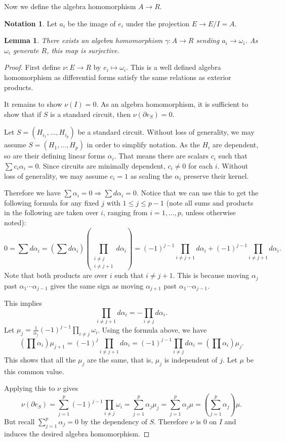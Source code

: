 \documentclass[article,twoside]{article}
\theoremstyle{plain}
\theoremstyle{plain}
\newtheorem{lemma}[lemma]{Lemma}
\theoremstyle{plain}
\theoremstyle{plain}
\theoremstyle{plain}
\theoremstyle{definition}
\theoremstyle{definition}
\newtheorem{notation}[notation]{Notation}
\theoremstyle{definition}
\theoremstyle{remark}
\theoremstyle{remark}
\begin{document}
Now we define the algebra homomorphism $A\to R$.

\begin{notation}
	Let $a_i$ be the image of $e_i$ under the projection $E\to E/I=A$.
\end{notation}

\begin{lemma}\label{os_brieskorn_alg_hom}%
	There exists an algebra homomorphism $\gamma:A\to R$ sending $a_i\to \omega_i$. As $\omega_i$ generate $R$, this map is surjective.
\end{lemma}
\begin{proof}
	First define $\nu:E\to R$ by $e_i\mapsto\omega_i$. This is a well defined algebra homomorphism as differential forms satisfy the same relations as exterior products.
	
	It remains to show $\nu(I)=0$. As an algebra homomorphism, it is sufficient to show that if $S$ is a standard circuit, then $\nu(\partial e_S)=0$.
	
	Let $S=(H_{i_1},\dots,H_{i_p})$ be a standard circuit. Without loss of generality, we may assume $S=(H_1,\dots,H_p)$ in order to simplify notation. As the $H_i$ are dependent, so are their defining linear forms $\alpha_i$. That means there are scalars $c_i$ such that $\sum c_i\alpha_i=0$. Since circuits are minimally dependent, $c_i\neq 0$ for each $i$. Without loss of generality, we may assume $c_i=1$ as scaling the $\alpha_i$ preserve their kernel.
	
	Therefore we have $\sum \alpha_i =0 \Rightarrow \sum d\alpha_i =0$. Notice that we can use this to get the following formula for any fixed $j$ with $1\leq j\leq p-1$ (note all sums and products in the following are taken over $i$, ranging from $i=1,\dots,p$, unless otherwise noted):
	$$
	0=\sum d\alpha_i =\left(\sum d\alpha_i\right) \left(\prod_{\substack{i\neq j\\i\neq j+1}}d\alpha_i\right) = (-1)^{j-1}\prod_{i\neq j+1}d\alpha_i + (-1)^{j-1}\prod_{i\neq j+1}d\alpha_i.
	$$
	Note that both products are over $i$ such that $i\neq j+1$. This is because moving $\alpha_j$ past $\alpha_1\cdots\alpha_{j-1}$ gives the same sign as moving $\alpha_{j+1}$ past $\alpha_1\cdots\alpha_{j-1}$.
	
	This implies
	$$
	\prod_{i\neq j+1}d\alpha_i = - \prod_{i\neq j}d\alpha_i.
	$$
	Let $\mu_j = \frac{1}{\alpha_j}(-1)^{j-1}\prod_{i\neq j}\omega_i$. Using the formula above, we have
	$$
	\left(\prod\alpha_i\right)\mu_{j+1} = (-1)^j\prod_{i\neq j+1}d\alpha_i
	= (-1)^{j-1}\prod_{i\neq j}d\alpha_i = \left(\prod\alpha_i\right)\mu_{j}.
	$$
	This shows that all the $\mu_j$ are the same, that is, $\mu_j$ is independent of $j$. Let $\mu$ be this common value.

	Applying this to $\nu$ gives
	$$
	\nu(\partial e_S) = \sum_{j=1}^p(-1)^{j-1}\prod_{i\neq j}\omega_i = \sum_{j=1}^p \alpha_j\mu_j
	=\sum_{j=1}^p\alpha_j\mu = \left(\sum_{j=1}^p\alpha_j\right)\mu.
	$$
	But recall $\sum_{j=1}^p\alpha_j=0$ by the dependency of $S$. Therefore $\nu$ is $0$ on $I$ and induces the desired algebra homomorphism.
\end{proof}
\end{document}
